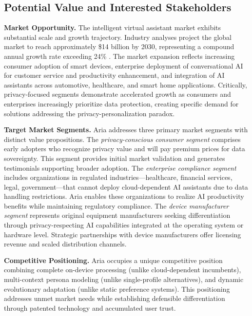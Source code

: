 \documentclass[11pt]{article}
\begin{document}
\subsection{Potential Value and Interested Stakeholders}
\vspace*{-8pt}
\textbf{Market Opportunity.} The intelligent virtual assistant market exhibits substantial scale and growth trajectory. Industry analyses project the global market to reach approximately \$14 billion by 2030, representing a compound annual growth rate exceeding 24\% \cite{grandview2023iva}. The market expansion reflects increasing consumer adoption of smart devices, enterprise deployment of conversational AI for customer service and productivity enhancement, and integration of AI assistants across automotive, healthcare, and smart home applications. Critically, privacy-focused segments demonstrate accelerated growth as consumers and enterprises increasingly prioritize data protection, creating specific demand for solutions addressing the privacy-personalization paradox.

\textbf{Target Market Segments.} Aria addresses three primary market segments with distinct value propositions. The \textit{privacy-conscious consumer segment} comprises early adopters who recognize privacy value and will pay premium prices for data sovereignty. This segment provides initial market validation and generates testimonials supporting broader adoption. The \textit{enterprise compliance segment} includes organizations in regulated industries---healthcare, financial services, legal, government---that cannot deploy cloud-dependent AI assistants due to data handling restrictions. Aria enables these organizations to realize AI productivity benefits while maintaining regulatory compliance. The \textit{device manufacturer segment} represents original equipment manufacturers seeking differentiation through privacy-respecting AI capabilities integrated at the operating system or hardware level. Strategic partnerships with device manufacturers offer licensing revenue and scaled distribution channels.

\textbf{Competitive Positioning.} Aria occupies a unique competitive position combining complete on-device processing (unlike cloud-dependent incumbents), multi-context persona modeling (unlike single-profile alternatives), and dynamic evolutionary adaptation (unlike static preference systems). This positioning addresses unmet market needs while establishing defensible differentiation through patented technology and accumulated user trust.
\end{document}
